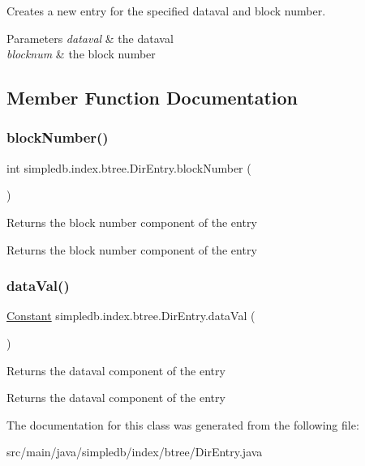 Creates a new entry for the specified dataval and block number. 
\begin{DoxyParams}{Parameters}
{\em dataval} & the dataval \\
\hline
{\em blocknum} & the block number \\
\hline
\end{DoxyParams}


\subsection{Member Function Documentation}
\mbox{\label{classsimpledb_1_1index_1_1btree_1_1DirEntry_a2a400c20859d3be59d333b14802711e4}} 
\subsubsection{\texorpdfstring{block\+Number()}{blockNumber()}}
{\footnotesize\ttfamily int simpledb.\+index.\+btree.\+Dir\+Entry.\+block\+Number (\begin{DoxyParamCaption}{ }\end{DoxyParamCaption})\hspace{0.3cm}{\ttfamily [inline]}}

Returns the block number component of the entry \begin{DoxyReturn}{Returns}
the block number component of the entry 
\end{DoxyReturn}
\mbox{\label{classsimpledb_1_1index_1_1btree_1_1DirEntry_a7cbdc9d126bd11396e03cf671bf7d93e}} 
\subsubsection{\texorpdfstring{data\+Val()}{dataVal()}}
{\footnotesize\ttfamily \hyperlink{classsimpledb_1_1query_1_1Constant}{Constant} simpledb.\+index.\+btree.\+Dir\+Entry.\+data\+Val (\begin{DoxyParamCaption}{ }\end{DoxyParamCaption})\hspace{0.3cm}{\ttfamily [inline]}}

Returns the dataval component of the entry \begin{DoxyReturn}{Returns}
the dataval component of the entry 
\end{DoxyReturn}


The documentation for this class was generated from the following file\+:\begin{DoxyCompactItemize}
\item 
src/main/java/simpledb/index/btree/Dir\+Entry.\+java\end{DoxyCompactItemize}
